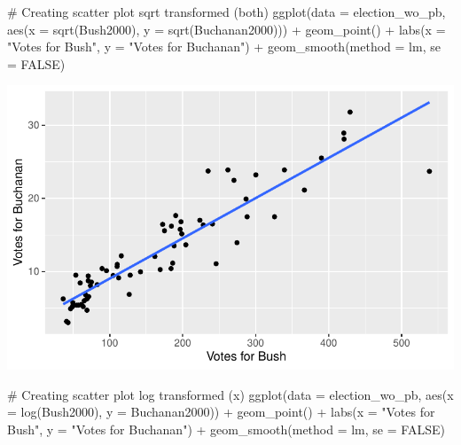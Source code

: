 \documentclass[
  letterpaper,
  DIV=11,
  numbers=noendperiod]{scrartcl}
\newenvironment{Shaded}{\begin{snugshade}}{\end{snugshade}}
\newcommand{\AttributeTok}[1]{\textcolor[rgb]{0.40,0.45,0.13}{#1}}
\newcommand{\CommentTok}[1]{\textcolor[rgb]{0.37,0.37,0.37}{#1}}
\newcommand{\ConstantTok}[1]{\textcolor[rgb]{0.56,0.35,0.01}{#1}}
\newcommand{\FunctionTok}[1]{\textcolor[rgb]{0.28,0.35,0.67}{#1}}
\newcommand{\NormalTok}[1]{\textcolor[rgb]{0.00,0.23,0.31}{#1}}
\newcommand{\SpecialCharTok}[1]{\textcolor[rgb]{0.37,0.37,0.37}{#1}}
\newcommand{\StringTok}[1]{\textcolor[rgb]{0.13,0.47,0.30}{#1}}
\begin{document}
\begin{Shaded}
\begin{Highlighting}[]
\CommentTok{\# Creating scatter plot sqrt transformed (both)}
\FunctionTok{ggplot}\NormalTok{(}\AttributeTok{data =}\NormalTok{ election\_wo\_pb, }\FunctionTok{aes}\NormalTok{(}\AttributeTok{x =} \FunctionTok{sqrt}\NormalTok{(Bush2000), }\AttributeTok{y =} \FunctionTok{sqrt}\NormalTok{(Buchanan2000))) }\SpecialCharTok{+}
  \FunctionTok{geom\_point}\NormalTok{() }\SpecialCharTok{+}
  \FunctionTok{labs}\NormalTok{(}\AttributeTok{x =} \StringTok{"Votes for Bush"}\NormalTok{, }\AttributeTok{y =} \StringTok{"Votes for Buchanan"}\NormalTok{) }\SpecialCharTok{+}
  \FunctionTok{geom\_smooth}\NormalTok{(}\AttributeTok{method =}\NormalTok{ lm, }\AttributeTok{se =} \ConstantTok{FALSE}\NormalTok{)}
\end{Highlighting}
\end{Shaded}

\includegraphics{case-study-template_files/figure-pdf/unnamed-chunk-6-6.pdf}

\begin{Shaded}
\begin{Highlighting}[]
\CommentTok{\# Creating scatter plot log transformed (x)}
\FunctionTok{ggplot}\NormalTok{(}\AttributeTok{data =}\NormalTok{ election\_wo\_pb, }\FunctionTok{aes}\NormalTok{(}\AttributeTok{x =} \FunctionTok{log}\NormalTok{(Bush2000), }\AttributeTok{y =}\NormalTok{ Buchanan2000)) }\SpecialCharTok{+}
  \FunctionTok{geom\_point}\NormalTok{() }\SpecialCharTok{+}
  \FunctionTok{labs}\NormalTok{(}\AttributeTok{x =} \StringTok{"Votes for Bush"}\NormalTok{, }\AttributeTok{y =} \StringTok{"Votes for Buchanan"}\NormalTok{) }\SpecialCharTok{+}
  \FunctionTok{geom\_smooth}\NormalTok{(}\AttributeTok{method =}\NormalTok{ lm, }\AttributeTok{se =} \ConstantTok{FALSE}\NormalTok{)}
\end{Highlighting}
\end{Shaded}
\end{document}
